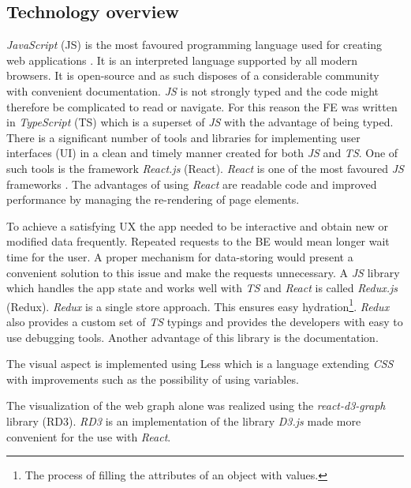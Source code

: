 \subsection{Technology overview}
\textit{JavaScript} \cite{javaScript} (JS) is the most favoured programming language used for creating web applications \cite{jsGithut}. It is an interpreted language supported by all modern browsers. It is open-source and as such disposes of a considerable community with convenient documentation. \textit{JS} is not strongly typed and the code might therefore be complicated to read or navigate. For this reason the FE was written in \textit{TypeScript} (TS) \cite{typeScript} which is a superset of \textit{JS} with the advantage of being typed. There is a significant number of tools and libraries for implementing user interfaces (UI) in a clean and timely manner created for both \textit{JS} and \textit{TS}. One of such tools is the framework \textit{React.js} \cite{react} (React). \textit{React} is one of the most favoured \textit{JS} frameworks \cite{reactPopularity}. The advantages of using \textit{React} are readable code and improved performance by managing the re-rendering of page elements.

To achieve a satisfying UX the app needed to be interactive and obtain new or modified data frequently. Repeated requests to the BE would mean longer wait time for the user. A proper mechanism for data-storing would present a convenient solution to this issue and make the requests unnecessary. A \textit{JS} library which handles the app state and works well with \textit{TS} and \textit{React} is called \textit{Redux.js} \cite{redux} (Redux). \textit{Redux} is a single store approach. This ensures easy hydration\footnote{The process of filling the attributes of an object with values.}. \textit{Redux} also provides a custom set of \textit{TS} typings and provides the developers with easy to use debugging tools. Another advantage of this library is the documentation.

The visual aspect is implemented using Less \cite{less} which is a language extending \textit{CSS} with improvements such as the possibility of using variables.

The visualization of the web graph alone was realized using the \textit{react-d3-graph} library \cite{reactD3Graph} (RD3). \textit{RD3} is 
an implementation of the library \textit{D3.js} \cite{d3} made more convenient for the use with \textit{React}. 

